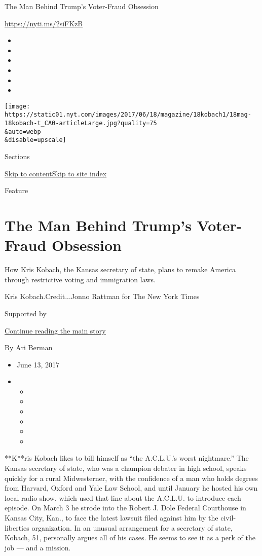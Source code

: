 The Man Behind Trump's Voter-Fraud Obsession

\url{https://nyti.ms/2siFKzB}

\begin{itemize}
\item
\item
\item
\item
\item
\item
\end{itemize}

\texttt{[image: https://static01.nyt.com/images/2017/06/18/magazine/18kobach1/18mag-18kobach-t\_CA0-articleLarge.jpg?quality=75\\\&auto=webp\\\&disable=upscale]}

Sections

\protect\hyperlink{site-content}{Skip to
content}\protect\hyperlink{site-index}{Skip to site index}

Feature

\hypertarget{the-man-behind-trumps-voter-fraud-obsession}{%
\section{The Man Behind Trump's Voter-Fraud
Obsession}\label{the-man-behind-trumps-voter-fraud-obsession}}

How Kris Kobach, the Kansas secretary of state, plans to remake America
through restrictive voting and immigration laws.

Kris Kobach.Credit...Jonno Rattman for The New York Times

Supported by

\protect\hyperlink{after-sponsor}{Continue reading the main story}

By Ari Berman

\begin{itemize}
\item
  June 13, 2017
\item
  \begin{itemize}
  \item
  \item
  \item
  \item
  \item
  \item
  \end{itemize}
\end{itemize}

**K**ris Kobach likes to bill himself as ``the A.C.L.U.'s worst
nightmare.'' The Kansas secretary of state, who was a champion debater
in high school, speaks quickly for a rural Midwesterner, with the
confidence of a man who holds degrees from Harvard, Oxford and Yale Law
School, and until January he hosted his own local radio show, which used
that line about the A.C.L.U. to introduce each episode. On March 3 he
strode into the Robert J. Dole Federal Courthouse in Kansas City, Kan.,
to face the latest lawsuit filed against him by the civil-liberties
organization. In an unusual arrangement for a secretary of state,
Kobach, 51, personally argues all of his cases. He seems to see it as a
perk of the job --- and a mission.

